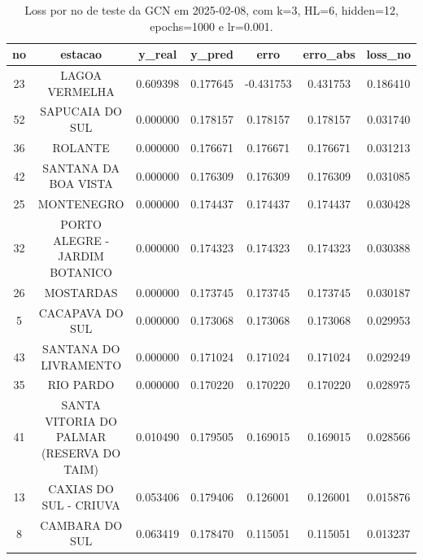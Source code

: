 \begin{table}[h]
\centering
\caption{Loss por no de teste da GCN em 2025-02-08, com k=3, HL=6, hidden=12, epochs=1000 e lr=0.001.}
\label{tab:gcn_loss_k3_hl6_h12_e1000_d20250208}
\begin{tabular}{ccccccc}
\toprule
no & estacao & y\_real & y\_pred & erro & erro\_abs & loss\_no \\
\midrule
23 & LAGOA VERMELHA & 0.609398 & 0.177645 & -0.431753 & 0.431753 & 0.186410 \\
52 & SAPUCAIA DO SUL & 0.000000 & 0.178157 & 0.178157 & 0.178157 & 0.031740 \\
36 & ROLANTE & 0.000000 & 0.176671 & 0.176671 & 0.176671 & 0.031213 \\
42 & SANTANA DA BOA VISTA & 0.000000 & 0.176309 & 0.176309 & 0.176309 & 0.031085 \\
25 & MONTENEGRO & 0.000000 & 0.174437 & 0.174437 & 0.174437 & 0.030428 \\
32 & PORTO ALEGRE - JARDIM BOTANICO & 0.000000 & 0.174323 & 0.174323 & 0.174323 & 0.030388 \\
26 & MOSTARDAS & 0.000000 & 0.173745 & 0.173745 & 0.173745 & 0.030187 \\
5 & CACAPAVA DO SUL & 0.000000 & 0.173068 & 0.173068 & 0.173068 & 0.029953 \\
43 & SANTANA DO LIVRAMENTO & 0.000000 & 0.171024 & 0.171024 & 0.171024 & 0.029249 \\
35 & RIO PARDO & 0.000000 & 0.170220 & 0.170220 & 0.170220 & 0.028975 \\
41 & SANTA VITORIA DO PALMAR (RESERVA DO TAIM) & 0.010490 & 0.179505 & 0.169015 & 0.169015 & 0.028566 \\
13 & CAXIAS DO SUL - CRIUVA & 0.053406 & 0.179406 & 0.126001 & 0.126001 & 0.015876 \\
8 & CAMBARA DO SUL & 0.063419 & 0.178470 & 0.115051 & 0.115051 & 0.013237 \\
\bottomrule
\end{tabular}
\end{table}

